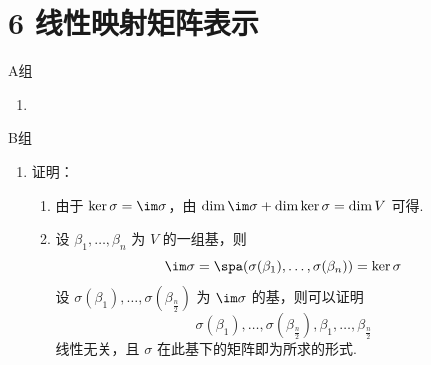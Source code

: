 \section*{6 线性映射矩阵表示}

\vspace{2ex}

\centerline{\heiti A组}
\begin{enumerate}
    \item
\end{enumerate}

\centerline{\heiti B组}
\begin{enumerate}

    \item 证明：\begin{enumerate}
              \item 由于 $ \ker \sigma = \im \sigma $，由 $ \dim \im \sigma + \dim \ker \sigma = \dim V $ 可得.

              \item 设 $ \beta_1, \ldots, \beta_n $ 为 $ V $ 的一组基，则
                    \[ \im \sigma = \spa(\sigma(\beta_1), \ldots, \sigma(\beta_n)) = \ker \sigma \]
                    设 $ \sigma(\beta_1), \ldots, \sigma(\beta_{\frac{n}{2}}) $ 为 $ \im \sigma $ 的基，则可以证明
                    \[ \sigma(\beta_1), \ldots, \sigma(\beta_{\frac{n}{2}}), \beta_1, \ldots, \beta_{\frac{n}{2}} \]
                    线性无关，且 $ \sigma $ 在此基下的矩阵即为所求的形式.
          \end{enumerate}

\end{enumerate}

